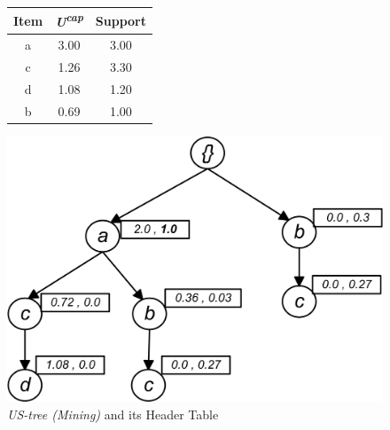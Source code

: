 \begin{figure}
\begin{minipage}{0.40\textwidth}
  \centering
  
	\begin{center}
	\begin{tabular}{ |c|c|c| } 
 	\hline
 		Item&\emph{U\textsuperscript{cap}}&Support\\ \hline\hline
 		a &  3.00  & 3.00\\ \hline
 		c &  1.26  & 3.30\\ \hline
 		d &  1.08  & 1.20\\ \hline
 		b &  0.69  & 1.00\\ \hline
\end{tabular}
\end{center}  
  
  
\end{minipage}
\hfill
\begin{minipage}{0.40\textwidth}
  \centering
  \includegraphics[width=\textwidth]{images/M_TREE.jpg}
\end{minipage}
\caption{\emph{US-tree (Mining)} and its Header Table}
\label{figure:min_ready}
\end{figure}
%